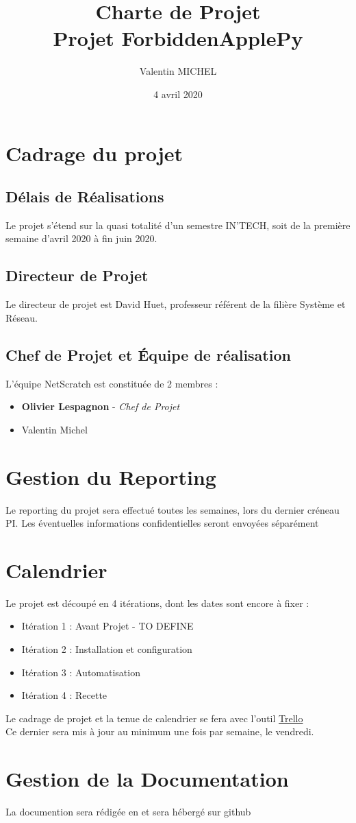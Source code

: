 \documentclass[14pt,a4paper]{extarticle}
\author{Valentin MICHEL}
\date{4 avril 2020}
\title{Charte de Projet \\ Projet ForbiddenApplePy}
\begin{document}
\maketitle{}
\justify
\break
\tableofcontents
\break
\section{Cadrage du projet}
\subsection{Délais de Réalisations}
Le projet s'étend sur la quasi totalité d'un semestre IN'TECH, soit de la première semaine d'avril 2020 à fin juin 2020.

\subsection{Directeur de Projet}
Le directeur de projet est David Huet, professeur référent de la filière Système et Réseau.

\break
\subsection{Chef de Projet et Équipe de réalisation}
L'équipe NetScratch est constituée de 2 membres :
\begin{itemize}
    \item{\textbf{Olivier Lespagnon} - \textit{Chef de Projet}}
    \item{Valentin Michel}
\end{itemize}

\break
\section{Gestion du Reporting}
Le reporting du projet sera effectué toutes les semaines, lors du dernier créneau PI.
Les éventuelles informations confidentielles seront envoyées séparément
\section{Calendrier}
Le projet est découpé en 4 itérations, dont les dates sont encore à fixer :
\begin{itemize}
    \item{Itération 1 : Avant Projet - TO DEFINE}
    \item{Itération 2 : Installation et configuration}
    \item{Itération 3 : Automatisation}
    \item{Itération 4 : Recette}
\end{itemize}
Le cadrage de projet et la tenue de calendrier se fera avec l'outil \href{https://trello.com/b/XQZtrqGi}{Trello} \\
Ce dernier sera mis à jour au minimum une fois par semaine, le vendredi.
\section{Gestion de la Documentation}
La documention sera rédigée en \Latex et sera hébergé sur github

\break
\end{document}
